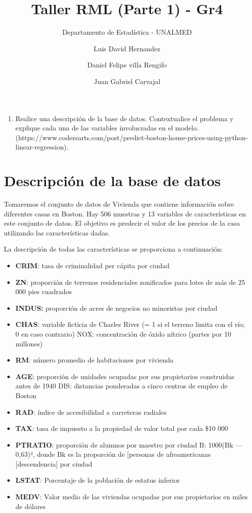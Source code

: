 \documentclass[
  letterpaper,
  DIV=11,
  numbers=noendperiod]{scrartcl}
\title{Taller RML (Parte 1) - Gr4}
\subtitle{Departamento de Estadística - UNALMED}
\author{Luis David Hernandez \and Daniel Felipe villa Rengifo \and Juan
Gabriel Carvajal}
\date{}
\providecommand{\tightlist}{%
  \setlength{\itemsep}{0pt}\setlength{\parskip}{0pt}}\usepackage{longtable,booktabs,array}
\begin{document}
\maketitle


\begin{enumerate}
\def\labelenumi{\arabic{enumi}.}
\tightlist
\item
  Realice una descripción de la base de datos. Contextualice el problema
  y explique cada una de las variables involucradas en el modelo.
  (https://www.codersarts.com/post/predict-boston-house-prices-using-python-linear-regression).
\end{enumerate}

\section{Descripción de la base de
datos}\label{descripciuxf3n-de-la-base-de-datos}

Tomaremos el conjunto de datos de Vivienda que contiene información
sobre diferentes casas en Boston. Hay 506 muestras y 13 variables de
características en este conjunto de datos. El objetivo es predecir el
valor de los precios de la casa utilizando las características dadas.

La descripción de todas las características se proporciona a
continuación:

\begin{itemize}
\item
  \textbf{CRIM}: tasa de criminalidad per cápita por ciudad
\item
  \textbf{ZN}: proporción de terrenos residenciales zonificados para
  lotes de más de 25 000 pies cuadrados
\item
  \textbf{INDUS:} proporción de acres de negocios no minoristas por
  ciudad
\item
  \textbf{CHAS}: variable ficticia de Charles River (= 1 si el terreno
  limita con el río; 0 en caso contrario) NOX: concentración de óxido
  nítrico (partes por 10 millones)
\item
  \textbf{RM}: número promedio de habitaciones por vivienda
\item
  \textbf{AGE}: proporción de unidades ocupadas por sus propietarios
  construidas antes de 1940 DIS: distancias ponderadas a cinco centros
  de empleo de Boston
\item
  \textbf{RAD}: índice de accesibilidad a carreteras radiales
\item
  \textbf{TAX}: tasa de impuesto a la propiedad de valor total por cada
  \$10 000
\item
  \textbf{PTRATIO}: proporción de alumnos por maestro por ciudad B:
  1000(Bk --- 0,63)², donde Bk es la proporción de {[}personas de
  afroamericanas {[}descendencia{]} por ciudad
\item
  \textbf{LSTAT}: Porcentaje de la población de estatus inferior
\item
  \textbf{MEDV}: Valor medio de las viviendas ocupadas por sus
  propietarios en miles de dólares
\end{itemize}
\end{document}
